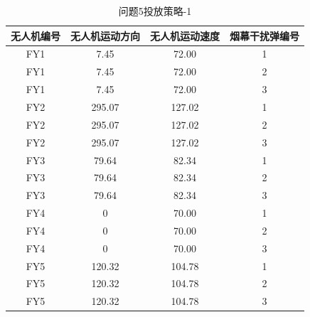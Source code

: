 \documentclass[../main.tex]{subfiles}
\begin{document}
\begin{table}[H]
\caption{问题5投放策略-1}
\label{tab:001} 
\centering
\begin{small}
\begin{tabular}{cccc}
\toprule[1.5pt]
无人机编号 &无人机运动方向 & 无人机运动速度  &烟幕干扰弹编号     \\  
\midrule[1pt]
  FY1           &7.45                   & 72.00     & 1     \\               
   FY1          &7.45                  & 72.00     & 2      \\               
   FY1          &7.45                   & 72.00     & 3    \\                
  FY2           &295.07                   & 127.02     & 1      \\                
  FY2           &295.07                   & 127.02     & 2       \\               
  FY2           &295.07                   & 127.02    & 3     \\               
  FY3           & 79.64                  & 82.34     & 1       \\               
FY3             & 79.64                  & 82.34     & 2    \\                
FY3             & 79.64                  & 82.34    & 3      \\                
  FY4           &0                   & 70.00     & 1      \\                
  FY4           &0                   & 70.00     & 2       \\               
  FY4           &0                   & 70.00    & 3     \\               
  FY5          & 120.32                 & 104.78     & 1       \\               
FY5         & 120.32                 & 104.78    & 2    \\                
FY5          &120.32                  & 104.78     & 3      \\               
\bottomrule[1.5pt]
\end{tabular}
\end{small}
\end{table}
\end{document}
